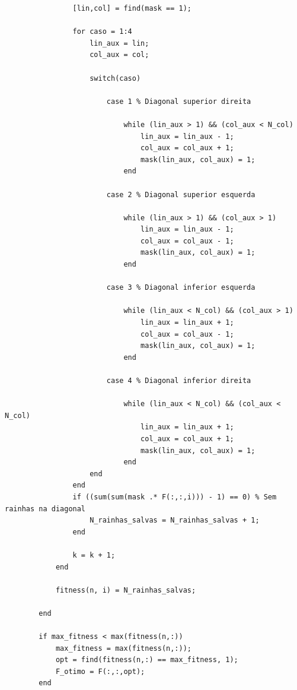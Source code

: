 \documentclass{report}
\begin{document}
\begin{lstlisting}
                [lin,col] = find(mask == 1);         
                
                for caso = 1:4
                    lin_aux = lin;
                    col_aux = col;

                    switch(caso)
                        
                        case 1 % Diagonal superior direita
                        
                            while (lin_aux > 1) && (col_aux < N_col)
                                lin_aux = lin_aux - 1;
                                col_aux = col_aux + 1;
                                mask(lin_aux, col_aux) = 1;
                            end

                        case 2 % Diagonal superior esquerda
                
                            while (lin_aux > 1) && (col_aux > 1)
                                lin_aux = lin_aux - 1;
                                col_aux = col_aux - 1;
                                mask(lin_aux, col_aux) = 1;
                            end

                        case 3 % Diagonal inferior esquerda

                            while (lin_aux < N_col) && (col_aux > 1)
                                lin_aux = lin_aux + 1;
                                col_aux = col_aux - 1;
                                mask(lin_aux, col_aux) = 1;
                            end
                        
                        case 4 % Diagonal inferior direita

                            while (lin_aux < N_col) && (col_aux < N_col)
                                lin_aux = lin_aux + 1;
                                col_aux = col_aux + 1;
                                mask(lin_aux, col_aux) = 1;
                            end
                    end
                end
                if ((sum(sum(mask .* F(:,:,i))) - 1) == 0) % Sem rainhas na diagonal
                    N_rainhas_salvas = N_rainhas_salvas + 1;
                end
                
                k = k + 1;
            end

            fitness(n, i) = N_rainhas_salvas;

        end

        if max_fitness < max(fitness(n,:))
            max_fitness = max(fitness(n,:));
            opt = find(fitness(n,:) == max_fitness, 1);
            F_otimo = F(:,:,opt);
        end


\end{lstlisting}
\end{document}
